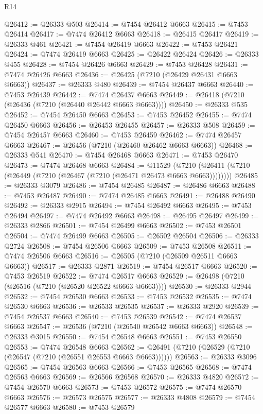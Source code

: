 \begin{lexlean}{R14}
\begin{coremodule}
{{{{{{{{{{{{{{{{{{{{{{{{{{{{{{{{{{{{{{{{{{{{{{{{{{{{{{{{{{{{{{{{{{{{{{{{{{{{{{{{{{@26412 := @26333 @503
@26414 := @7454 @26412 @6663
@26415 := @7453 @26414
@26417 := @7474 @26412 @6663
@26418 := @26415 @26417
@26419 := @26333 @461
@26421 := @7454 @26419 @6663
@26422 := @7453 @26421
@26424 := @7474 @26419 @6663
@26425 := @26422 @26424
@26426 := @26333 @455
@26428 := @7454 @26426 @6663
@26429 := @7453 @26428
@26431 := @7474 @26426 @6663
@26436 := @26425 (@7210 (@26429 @26431 @6663 @6663))
@26437 := @26333 @480
@26439 := @7454 @26437 @6663
@26440 := @7453 @26439
@26442 := @7474 @26437 @6663
@26449 := @26418 (@7210 (@26436 (@7210 (@26440 @26442 @6663 @6663))))
@26450 := @26333 @535
@26452 := @7454 @26450 @6663
@26453 := @7453 @26452
@26455 := @7474 @26450 @6663
@26456 := @26453 @26455
@26457 := @26333 @508
@26459 := @7454 @26457 @6663
@26460 := @7453 @26459
@26462 := @7474 @26457 @6663
@26467 := @26456 (@7210 (@26460 @26462 @6663 @6663))
@26468 := @26333 @541
@26470 := @7454 @26468 @6663
@26471 := @7453 @26470
@26473 := @7474 @26468 @6663
@26484 := @11529
    (@7210 (@26411 (@7210 (@26449 (@7210 (@26467 (@7210 (@26471 @26473 @6663 @6663))))))))
@26485 := @26333 @3079
@26486 := @7454 @26485
@26487 := @26486 @6663
@26488 := @7453 @26487
@26490 := @7474 @26485 @6663
@26491 := @26488 @26490
@26492 := @26333 @2915
@26494 := @7454 @26492 @6663
@26495 := @7453 @26494
@26497 := @7474 @26492 @6663
@26498 := @26495 @26497
@26499 := @26333 @2866
@26501 := @7454 @26499 @6663
@26502 := @7453 @26501
@26504 := @7474 @26499 @6663
@26505 := @26502 @26504
@26506 := @26333 @2724
@26508 := @7454 @26506 @6663
@26509 := @7453 @26508
@26511 := @7474 @26506 @6663
@26516 := @26505 (@7210 (@26509 @26511 @6663 @6663))
@26517 := @26333 @2871
@26519 := @7454 @26517 @6663
@26520 := @7453 @26519
@26522 := @7474 @26517 @6663
@26529 := @26498 (@7210 (@26516 (@7210 (@26520 @26522 @6663 @6663))))
@26530 := @26333 @2944
@26532 := @7454 @26530 @6663
@26533 := @7453 @26532
@26535 := @7474 @26530 @6663
@26536 := @26533 @26535
@26537 := @26333 @2920
@26539 := @7454 @26537 @6663
@26540 := @7453 @26539
@26542 := @7474 @26537 @6663
@26547 := @26536 (@7210 (@26540 @26542 @6663 @6663))
@26548 := @26333 @3015
@26550 := @7454 @26548 @6663
@26551 := @7453 @26550
@26553 := @7474 @26548 @6663
@26562 := @26491 (@7210 (@26529 (@7210 (@26547 (@7210 (@26551 @26553 @6663 @6663))))))
@26563 := @26333 @3096
@26565 := @7454 @26563 @6663
@26566 := @7453 @26565
@26568 := @7474 @26563 @6663
@26569 := @26566 @26568
@26570 := @26333 @4820
@26572 := @7454 @26570 @6663
@26573 := @7453 @26572
@26575 := @7474 @26570 @6663
@26576 := @26573 @26575
@26577 := @26333 @4808
@26579 := @7454 @26577 @6663
@26580 := @7453 @26579
}}}}}}}}}}}}}}}}}}}}}}}}}}}}}}}}}}}}}}}}}}}}}}}}}}}}}}}}}}}}}}}}}}}}}}}}}}}}}}}}}}
\end{coremodule}
\end{lexlean}
